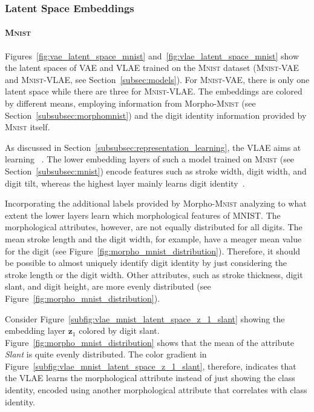 \subsubsection{Latent Space Embeddings}\label{subsubsec:latent_space_embeddings}

\paragraph{\textsc{Mnist}}

Figures~\ref{fig:vae_latent_space_mnist} and~\ref{fig:vlae_latent_space_mnist} show the latent spaces of \ac{VAE} and \ac{VLAE} trained on the \textsc{Mnist} dataset (\textsc{Mnist}-\ac{VAE} and \textsc{Mnist}-\ac{VLAE}, see Section~\ref{subsec:models}).
For \textsc{Mnist}-\ac{VAE}, there is only one latent space while there are three for \textsc{Mnist}-\ac{VLAE}.
The embeddings are colored by different means, employing information from Morpho-\textsc{Mnist} (see Section~\ref{subsubsec:morphomnist}) and the digit identity information provided by \textsc{Mnist} itself.

As discussed in Section~\ref{subsubsec:representation_learning}, the \ac{VLAE} aims at learning ~\citep{zhao2017learning}.
The lower embedding layers of such a model trained on \textsc{Mnist} (see Section~\ref{subsubsec:mnist}) encode features such as stroke width, digit width, and digit tilt, whereas the highest layer mainly learns digit identity~\citep{zhao2017learning}.

Incorporating the additional labels provided by Morpho-\textsc{Mnist} analyzing to what extent the lower layers learn which morphological features of \textsc{MNIST}.
The morphological attributes, however, are not equally distributed for all digits.
The mean stroke length and the digit width, for example, have a meager mean value for the digit  (see Figure~\ref{fig:morpho_mnist_distribution}).
Therefore, it should be possible to almost uniquely identify digit  identity by just considering the stroke length or the digit width.
Other attributes, such as stroke thickness, digit slant, and digit height, are more evenly distributed (see Figure~\ref{fig:morpho_mnist_distribution}).

Consider Figure~\ref{subfig:vlae_mnist_latent_space_z_1_slant} showing the embedding layer $\bm{z}_1$ colored by digit slant.
Figure~\ref{fig:morpho_mnist_distribution} shows that the mean of the attribute \textit{Slant} is quite evenly distributed.
The color gradient in Figure~\ref{subfig:vlae_mnist_latent_space_z_1_slant}, therefore, indicates that the VLAE learns the morphological attribute instead of just showing the class identity, encoded using another morphological attribute that correlates with class identity.

